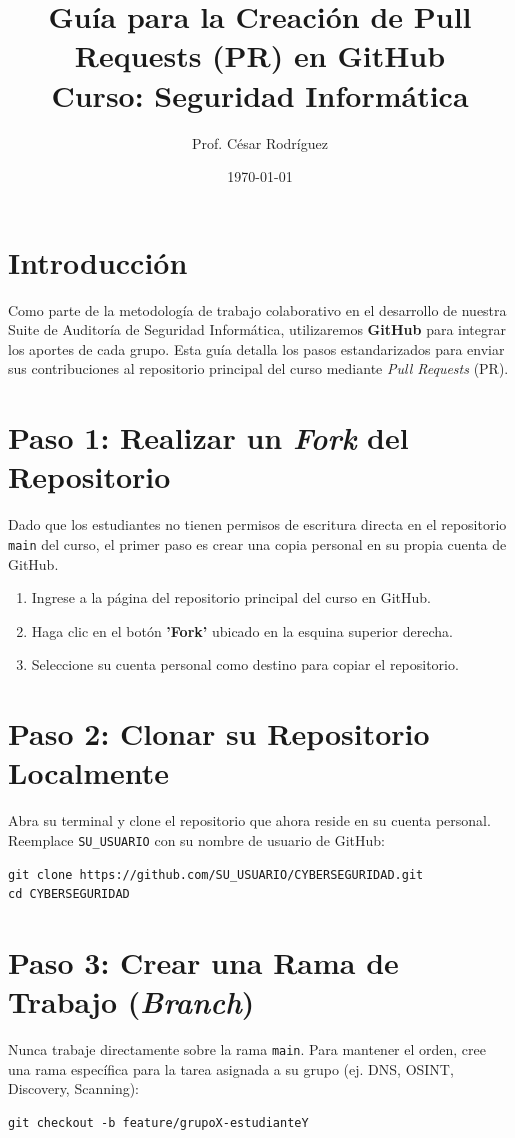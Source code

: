 \documentclass[12pt,a4paper]{article}
\title{Guía para la Creación de Pull Requests (PR) en GitHub \\ \large Curso: Seguridad Informática}
\author{Prof. César Rodríguez}
\date{\today}
\begin{document}
\maketitle

\section*{Introducción}
Como parte de la metodología de trabajo colaborativo en el desarrollo de nuestra Suite de Auditoría de Seguridad Informática, utilizaremos \textbf{GitHub} para integrar los aportes de cada grupo. Esta guía detalla los pasos estandarizados para enviar sus contribuciones al repositorio principal del curso mediante \textit{Pull Requests} (PR).

\section{Paso 1: Realizar un \textit{Fork} del Repositorio}
Dado que los estudiantes no tienen permisos de escritura directa en el repositorio \texttt{main} del curso, el primer paso es crear una copia personal en su propia cuenta de GitHub.
\begin{enumerate}
    \item Ingrese a la página del repositorio principal del curso en GitHub.
    \item Haga clic en el botón \textbf{'Fork'} ubicado en la esquina superior derecha.
    \item Seleccione su cuenta personal como destino para copiar el repositorio.
\end{enumerate}

\section{Paso 2: Clonar su Repositorio Localmente}
Abra su terminal y clone el repositorio que ahora reside en su cuenta personal. Reemplace \texttt{SU\_USUARIO} con su nombre de usuario de GitHub:
\begin{verbatim}
git clone https://github.com/SU_USUARIO/CYBERSEGURIDAD.git
cd CYBERSEGURIDAD
\end{verbatim}

\section{Paso 3: Crear una Rama de Trabajo (\textit{Branch})}
Nunca trabaje directamente sobre la rama \texttt{main}. Para mantener el orden, cree una rama específica para la tarea asignada a su grupo (ej. DNS, OSINT, Discovery, Scanning):
\begin{verbatim}
git checkout -b feature/grupoX-estudianteY
\end{verbatim}
\end{document}
